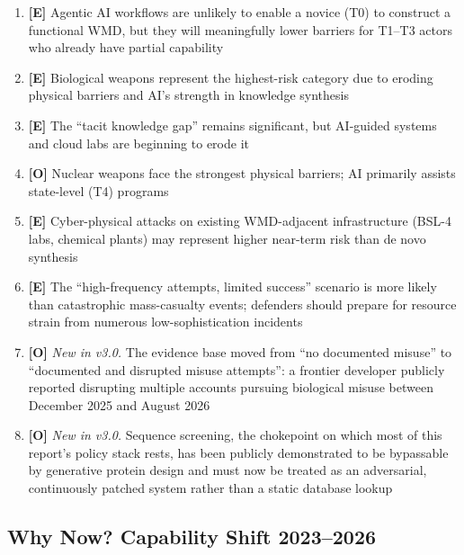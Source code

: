 \documentclass[11pt,letterpaper]{article}
\begin{document}
\begin{keybox}
\begin{enumerate}
  \item \textbf{[E]} Agentic AI workflows are unlikely to enable a novice (T0) to construct a functional WMD, but they will meaningfully lower barriers for T1--T3 actors who already have partial capability
  \item \textbf{[E]} Biological weapons represent the highest-risk category due to eroding physical barriers and AI's strength in knowledge synthesis
  \item \textbf{[E]} The ``tacit knowledge gap'' remains significant, but AI-guided systems and cloud labs are beginning to erode it
  \item \textbf{[O]} Nuclear weapons face the strongest physical barriers; AI primarily assists state-level (T4) programs
  \item \textbf{[E]} Cyber-physical attacks on existing WMD-adjacent infrastructure (BSL-4 labs, chemical plants) may represent higher near-term risk than de novo synthesis
  \item \textbf{[E]} The ``high-frequency attempts, limited success'' scenario is more likely than catastrophic mass-casualty events; defenders should prepare for resource strain from numerous low-sophistication incidents
  \item \textbf{[O]} \textit{New in v3.0.} The evidence base moved from ``no documented misuse'' to ``documented and disrupted misuse attempts'': a frontier developer publicly reported disrupting multiple accounts pursuing biological misuse between December 2025 and August 2026
  \item \textbf{[O]} \textit{New in v3.0.} Sequence screening, the chokepoint on which most of this report's policy stack rests, has been publicly demonstrated to be bypassable by generative protein design and must now be treated as an adversarial, continuously patched system rather than a static database lookup
\end{enumerate}
\end{keybox}

\subsection*{Why Now? Capability Shift 2023--2026}
\end{document}
